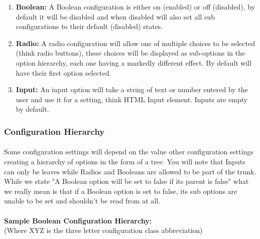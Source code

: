 \documentclass[]{article}
\begin{document}
\begin{enumerate}
    \item \textbf{Boolean:} A Boolean configuration is either on (enabled) or off (disabled), by default it will be disabled and when disabled will also set all sub configurations to their default (disabled) states.
    \item \textbf{Radio:} A radio configuration will allow one of multiple choices to be selected (think radio buttons), these choices will be displayed as sub-options in the option hierarchy, each one having a markedly different effect. By default will have their first option selected.
    \item \textbf{Input:} An input option will take a string of text or number entered by the user and use it for a setting, think HTML Input element. Inputs are empty by default.     
\end{enumerate}
\newpage
\subsubsection{Configuration Hierarchy}\label{confighier}
\paragraph{}
Some configuration settings will depend on the value other configuration settings creating a hierarchy of options in the form of a tree. You will note that Inputs can only be leaves while Radios and Booleans are allowed to be part of the trunk. While we state "A Boolean option will be set to false if its parent is false" what we really mean is that if a Boolean option is set to false, its sub options are unable to be set and shouldn't be read from at all.
\\\\
\textbf{Sample Boolean Configuration Hierarchy:}\\
(Where XYZ is the three letter configuration class abbreviation)
\end{document}
